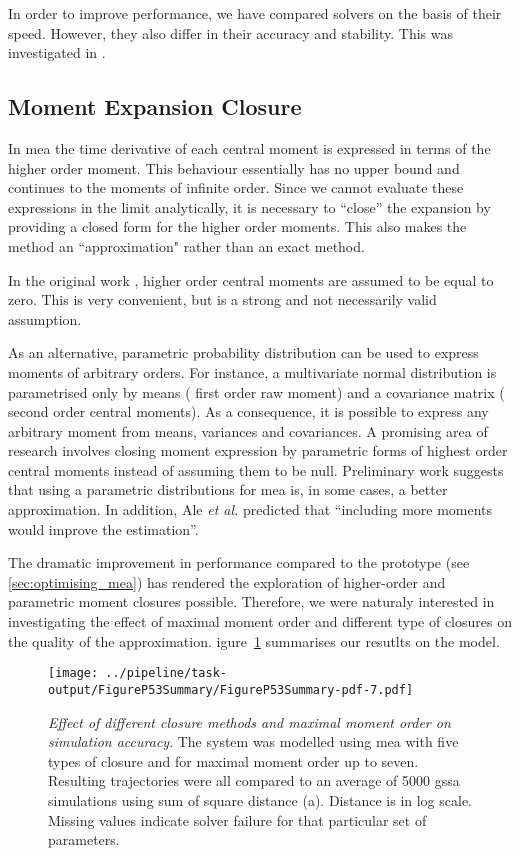 In order to improve performance, we have compared solvers on the basis of their speed.
However, they also differ in their accuracy and stability.
This was investigated in  .

\subsection{Moment Expansion Closure}

In \gls{mea} the time derivative of each central moment is expressed in terms of the higher order moment. 
This behaviour essentially has no upper bound and continues to the moments of infinite order. 
Since we cannot evaluate these expressions in the limit analytically, it is necessary to ``close'' the expansion by providing a closed form for the higher order moments.
This also makes the method an ``approximation" rather than an exact method.

In the original work \cite{ale_general_2013}, higher order central moments are assumed to be equal to zero.
This is very convenient, but is a strong and not necessarily valid assumption. 

As an alternative, parametric probability distribution can be used to express moments of arbitrary orders. 
For instance, a multivariate normal distribution is parametrised only by means (\ie{} first order raw moment)
and a covariance matrix (\ie{} second order central moments). 
As a consequence, it is possible to express any arbitrary moment from means, variances and covariances. 
A promising area of research involves closing moment expression by parametric forms of highest order central moments instead
of assuming them to be null.
Preliminary work  suggests that using a parametric distributions for \gls{mea} is, in some cases, a better approximation.
In addition, Ale \emph{et al.} predicted that ``including more moments would improve the estimation''\cite{ale_general_2013}.

The dramatic improvement in performance compared to the \mat{} prototype (see \autoref{sec:optimising_mea}) has rendered the exploration of higher-order and parametric moment closures possible.
Therefore, we were naturaly interested in investigating the effect of maximal moment order and different type of closures on the quality of the approximation.
igure~\ref{fig:max_order_and_closure_on_distance_summary} summarises our resutlts on the \pft{} model.

\begin{figure}[t]
    \centering
    \texttt{[image: ../pipeline/task-output/FigureP53Summary/FigureP53Summary-pdf-7.pdf]}
    \caption{\emph{Effect of different closure methods and maximal moment order on simulation accuracy}. The \pft system was modelled using \gls{mea} with five types of closure and for maximal moment order up to seven.
Resulting trajectories were all compared to an average of 5000 \gls{gssa} simulations using sum of square distance (a).
Distance is in log scale. Missing values indicate solver failure for that particular set of parameters.}
    \label{fig:max_order_and_closure_on_distance_summary}
\end{figure}

